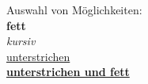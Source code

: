 \documentclass[a4paper, pdftex, 12pt, ngerman]{article}
\begin{document}
Auswahl von Möglichkeiten:\\
\textbf{fett}\\
\textit{kursiv}\\
\underline{unterstrichen}\\
\underline{\textbf{unterstrichen und fett}}\\
\end{document}
